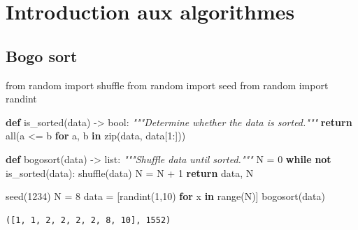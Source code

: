 \documentclass[
  letterpaper,
]{scrbook}
\newenvironment{Shaded}{}{}
\newcommand{\BuiltInTok}[1]{#1}
\newcommand{\CommentTok}[1]{\textcolor[rgb]{0.38,0.63,0.69}{\textit{#1}}}
\newcommand{\ControlFlowTok}[1]{\textcolor[rgb]{0.00,0.44,0.13}{\textbf{#1}}}
\newcommand{\DecValTok}[1]{\textcolor[rgb]{0.25,0.63,0.44}{#1}}
\newcommand{\ImportTok}[1]{#1}
\newcommand{\KeywordTok}[1]{\textcolor[rgb]{0.00,0.44,0.13}{\textbf{#1}}}
\newcommand{\NormalTok}[1]{#1}
\newcommand{\OperatorTok}[1]{\textcolor[rgb]{0.40,0.40,0.40}{#1}}
\theoremstyle{definition}
\theoremstyle{definition}
\theoremstyle{plain}
\theoremstyle{remark}
\begin{document}

\hypertarget{introduction-aux-algorithmes}{%
\chapter{Introduction aux
algorithmes}\label{introduction-aux-algorithmes}}

\hypertarget{bogo-sort}{%
\section{Bogo sort}\label{bogo-sort}}

\begin{Shaded}
\begin{Highlighting}[]
\ImportTok{from}\NormalTok{ random }\ImportTok{import}\NormalTok{ shuffle}
\ImportTok{from}\NormalTok{ random }\ImportTok{import}\NormalTok{ seed}
\ImportTok{from}\NormalTok{ random }\ImportTok{import}\NormalTok{ randint}

\KeywordTok{def}\NormalTok{ is\_sorted(data) }\OperatorTok{{-}\textgreater{}} \BuiltInTok{bool}\NormalTok{:}
    \CommentTok{"""Determine whether the data is sorted."""}
    \ControlFlowTok{return} \BuiltInTok{all}\NormalTok{(a }\OperatorTok{\textless{}=}\NormalTok{ b }\ControlFlowTok{for}\NormalTok{ a, b }\KeywordTok{in} \BuiltInTok{zip}\NormalTok{(data, data[}\DecValTok{1}\NormalTok{:]))}

\KeywordTok{def}\NormalTok{ bogosort(data) }\OperatorTok{{-}\textgreater{}} \BuiltInTok{list}\NormalTok{:}
    \CommentTok{"""Shuffle data until sorted."""}
\NormalTok{    N }\OperatorTok{=} \DecValTok{0}
    \ControlFlowTok{while} \KeywordTok{not}\NormalTok{ is\_sorted(data):}
\NormalTok{        shuffle(data)}
\NormalTok{        N }\OperatorTok{=}\NormalTok{ N }\OperatorTok{+} \DecValTok{1}
    \ControlFlowTok{return}\NormalTok{ data, N}

\NormalTok{seed(}\DecValTok{1234}\NormalTok{)}
\NormalTok{N }\OperatorTok{=} \DecValTok{8}
\NormalTok{data }\OperatorTok{=}\NormalTok{ [randint(}\DecValTok{1}\NormalTok{,}\DecValTok{10}\NormalTok{) }\ControlFlowTok{for}\NormalTok{ x }\KeywordTok{in} \BuiltInTok{range}\NormalTok{(N)]}
\NormalTok{bogosort(data)}
\end{Highlighting}
\end{Shaded}

\begin{verbatim}
([1, 1, 2, 2, 2, 2, 8, 10], 1552)
\end{verbatim}
\end{document}
